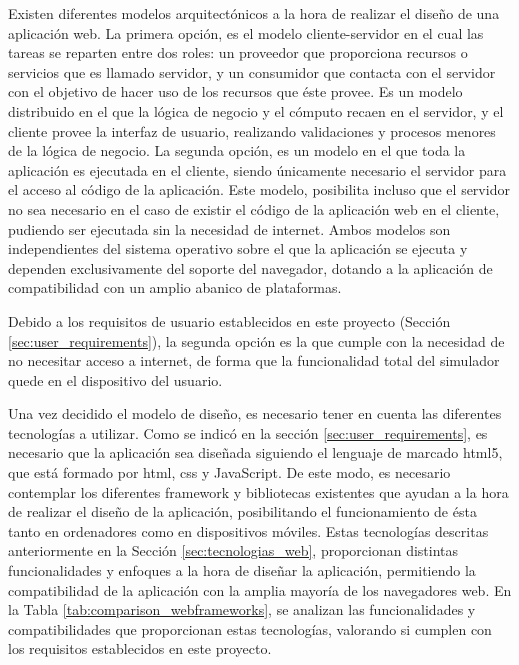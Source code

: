Existen diferentes modelos arquitectónicos a la hora de realizar el diseño de una aplicación web. La primera opción, es el modelo cliente-servidor en el cual las tareas se reparten entre dos roles: un proveedor que proporciona recursos o servicios que es llamado servidor, y un consumidor que contacta con el servidor con el objetivo de hacer uso de los recursos que éste provee. Es un modelo distribuido en el que la lógica de negocio y el cómputo recaen en el servidor, y el cliente provee la interfaz de usuario, realizando validaciones y procesos menores de la lógica de negocio. La segunda opción, es un modelo en el que toda la aplicación es ejecutada en el cliente, siendo únicamente necesario el servidor para el acceso al código de la aplicación. Este modelo, posibilita incluso que el servidor no sea necesario en el caso de existir el código de la aplicación web en el cliente, pudiendo ser ejecutada sin la necesidad de internet. Ambos modelos son independientes del sistema operativo sobre el que la aplicación  se ejecuta y dependen exclusivamente del soporte del navegador, dotando a la aplicación de compatibilidad con un amplio abanico de plataformas.

Debido a los requisitos de usuario establecidos en este proyecto (Sección \ref{sec:user_requirements}), la segunda opción es la que cumple con la necesidad de no necesitar acceso a internet, de forma que la funcionalidad total del simulador quede en el dispositivo del usuario.

Una vez decidido el modelo de diseño, es necesario tener en cuenta las diferentes tecnologías a utilizar. Como se indicó en la sección \ref{sec:user_requirements}, es necesario que la aplicación sea diseñada siguiendo el lenguaje de marcado \acrshort{html}5, que está formado por \acrshort{html}, \acrshort{css} y JavaScript. De este modo, es necesario contemplar los diferentes \gls{framework} y bibliotecas existentes que ayudan a la hora de realizar el diseño de la aplicación, posibilitando el funcionamiento de ésta tanto en ordenadores como en dispositivos móviles. Estas tecnologías descritas anteriormente en la Sección \ref{sec:tecnologias_web}, proporcionan distintas funcionalidades y enfoques a la hora de diseñar la aplicación, permitiendo la compatibilidad de la aplicación con la amplia mayoría de los navegadores web. En la Tabla \ref{tab:comparison_webframeworks}, se analizan las funcionalidades y compatibilidades que proporcionan estas tecnologías, valorando si cumplen con los requisitos establecidos en este proyecto.


